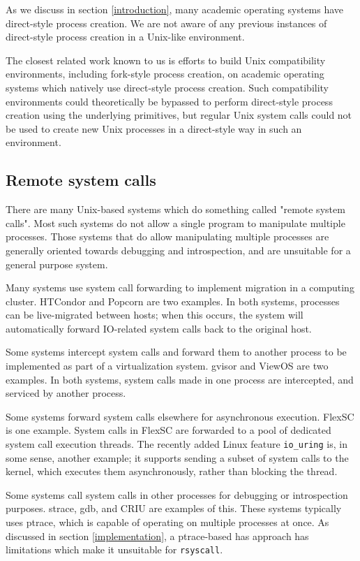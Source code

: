 \documentclass[letterpaper,twocolumn,10pt]{article}
\begin{document}
As we discuss in section \ref{introduction},
many academic operating systems have direct-style process creation.
We are not aware of any previous instances of direct-style process creation in a Unix-like environment.

The closest related work known to us
is efforts to build Unix compatibility environments, including fork-style process creation,
on academic operating systems which natively use direct-style process creation.\cite{exokernel}
Such compatibility environments could theoretically be bypassed to perform direct-style process creation
using the underlying primitives,
but regular Unix system calls could not be used to create new Unix processes in a direct-style way
in such an environment.
\subsection{Remote system calls}
There are many Unix-based systems which do something called "remote system calls".
Most such systems do not allow a single program to manipulate multiple processes.
Those systems that do allow manipulating multiple processes
are generally oriented towards debugging and introspection,
and are unsuitable for a general purpose system.

Many systems use system call forwarding to implement migration in a computing cluster.
HTCondor\cite{condor} and Popcorn\cite{popcorn} are two examples.
In both systems, processes can be live-migrated between hosts;
when this occurs, the system will automatically forward IO-related system calls
back to the original host.

Some systems intercept system calls and forward them to another process to be implemented
as part of a virtualization system.
gvisor\cite{gvisor} and ViewOS\cite{viewos} are two examples.
In both systems,
system calls made in one process are intercepted,
and serviced by another process.

Some systems forward system calls elsewhere for asynchronous execution.
FlexSC\cite{flexsc} is one example.
System calls in FlexSC are forwarded to a pool of dedicated system call execution threads.
The recently added Linux feature \verb|io_uring| is, in some sense, another example;
it supports sending a subset of system calls to the kernel,
which executes them asynchronously,
rather than blocking the thread.

Some systems call system calls in other processes for debugging or introspection purposes.
strace, gdb, and CRIU\cite{criu} are examples of this.
These systems typically uses ptrace,
which is capable of operating on multiple processes at once.
As discussed in section \ref{implementation},
a ptrace-based has approach has limitations which make it unsuitable for \texttt{rsyscall}.
\end{document}
